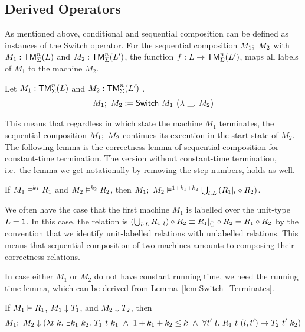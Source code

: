 \subsection{Derived Operators}
\label{sec:match-derived-operators}
%

As mentioned above, conditional and sequential composition can be defined as instances of the Switch operator.  For the sequential composition
$M_1 ;~ M_2$ with $M_1 : \mathsf{TM}_\Sigma^n(L)$ and $M_2 : \mathsf{TM}_\Sigma^n(L')$, the function $f : L \rightarrow \mathsf{TM}_\Sigma^n(L')$, maps all labels of $M_1$ to the
machine $M_2$.
\begin{definition}
  \label{def:Seq}
  Let $M_1 : \mathsf{TM}_\Sigma^n(L)$ and $M_2 : \mathsf{TM}_\Sigma^n(L')$ .
  \[
    M_1 ;~ M_2 := \mathsf{Switch}~M_1~
    \bigl(
    \lambda~\_.~M_2
    \bigr)
  \]
\end{definition}

This means that regardless in which state the machine $M_1$ terminates, the sequential composition $M_1 ;~ M_2$ continues its execution in the start
state of $M_2$.  The following lemma is the correctness lemma of sequential composition for constant-time termination.  The version without
constant-time termination, i.e.\ the lemma we get notationally by removing the step numbers, holds as well.

\begin{lemma}
  \label{lem:Seq_RealiseIn}
  If $M_1 \mathrel{\vDash^{k_1}} R_1$ and $M_2 \mathrel{\vDash^{k_2}} R_2$, then
  $M_1 ;~ M_2 \mathrel{\vDash^{1+k_1+k_2}} \bigcup_{l:L} \left(R_1{|}_{l} \circ R_2 \right)$.
\end{lemma}

We often have the case that the first machine $M_1$ is labelled over the unit-type $L = \mathsf{1}$.  In this case, the relation is
$\left(\bigcup_{l:L} R_1{|}_{l}\right) \circ R_2 \equiv R_1 {|}_{\mathsf{()}} \circ R_2 = R_1 \circ R_2$ by the convention that we identify unit-labelled
relations with unlabelled relations.  This means that sequential composition of two machines amounts to composing their correctness relations.

In case either $M_1$ or $M_2$ do not have constant running time, we need the running time lemma, which can be derived from
Lemma~\ref{lem:Switch_Terminates}.
\begin{lemma}
  \label{lem:Seq_TerminatesIn}
  If $M_1 \mathrel{\vDash} R_1$, $M_1 \mathrel{\downarrow} T_1$, and $M_2 \mathrel{\downarrow} T_2$, then
  \[
    M_1 \Seq M_2 \TerminatesIn
    \left(%
      \lambda t~k.~\exists k_1~k_2.~T_1~t~k_1 ~\land~ 1 + k_1 + k_2 \leq k ~\land~ \forall t'~l.~R_1~t~(l,t') \rightarrow T_2~t'~k_2%
    \right)
  \]
\end{lemma}


